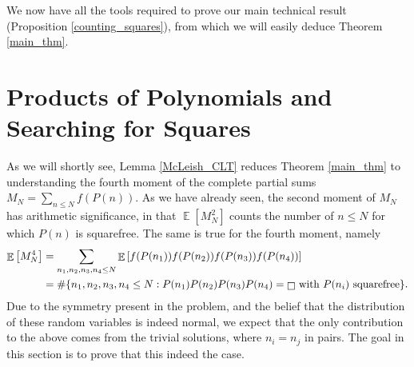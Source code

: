 \documentclass[11pts]{amsart}
\numberwithin{equation}{section}
\DeclareMathOperator{\E}{\mathbb{E}}
\let\oldsquare\square
\renewcommand{\square}[1][-1pt]{%
 {\raisebox{#1}{$\oldsquare$}}%
}
\begin{document}
We now have all the tools required to prove our main technical result (Proposition \ref{counting_squares}), from which we will easily deduce Theorem \ref{main_thm}.
\section{Products of Polynomials and Searching for Squares}
\label{main_section}

As we will shortly see, Lemma \ref{McLeish_CLT} reduces Theorem \ref{main_thm} to understanding the fourth moment of the complete partial sums $M_N=\sum_{n\leq N}f(P(n))$. As we have already seen, the second moment of $M_N$ has arithmetic significance, in that $\E\left[M_N^2\right]$ counts the number of $n\leq N$ for which $P(n)$ is squarefree. The same is true for the fourth moment, namely
\begin{align*}
    \E\left[M_N^4\right]
    &=
    \sum_{n_1,n_2,n_3,n_4\leq N}\E\left[f(P(n_1))f(P(n_2))f(P(n_3))f(P(n_4))\right]\\
    &=
    \#\{n_1,n_2,n_3,n_4\leq N: P(n_1)P(n_2)P(n_3)P(n_4)=\square\text{ with $P(n_i)$ squarefree}\}.
\end{align*}
Due to the symmetry present in the problem, and the belief that the distribution of these random variables is indeed normal, we expect that the only contribution to the above comes from the trivial solutions, where $n_i=n_j$ in pairs. The goal in this section is to prove that this indeed the case.
\end{document}

